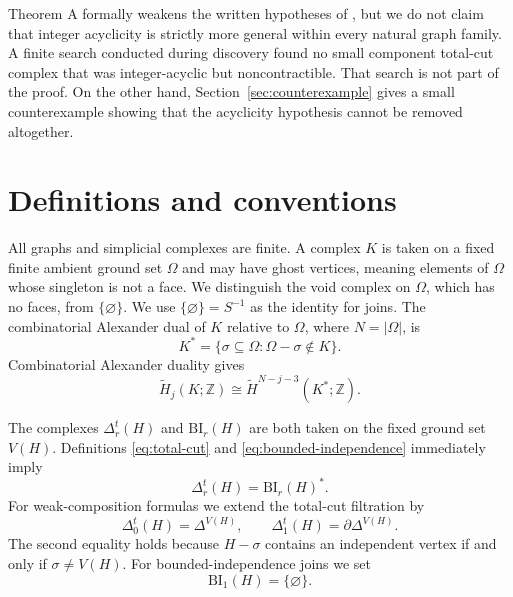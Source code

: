 \documentclass[11pt]{article}
\theoremstyle{remark}
\numberwithin{equation}{section}
\begin{document}
Theorem A formally weakens the written hypotheses of \cite[Theorem 28]{ref2},
but we do not claim that integer acyclicity is strictly more general within
every natural graph family. A finite search conducted during discovery found
no small component total-cut complex that was integer-acyclic but
noncontractible. That search is not part of the proof. On the other hand,
Section~\ref{sec:counterexample} gives a small counterexample showing that the
acyclicity hypothesis cannot be removed altogether.

\section{Definitions and conventions}\label{sec:definitions}

All graphs and simplicial complexes are finite. A complex $K$ is taken on a
fixed finite ambient ground set $\Omega$ and may have ghost vertices, meaning
elements of $\Omega$ whose singleton is not a face. We distinguish the void
complex on $\Omega$, which has no faces, from $\{\varnothing\}$. We use
$\{\varnothing\}=S^{-1}$ as the identity for joins. The combinatorial
Alexander dual of $K$ relative to $\Omega$, where $N=|\Omega|$, is
\begin{equation}
K^*=\{\sigma\subseteq\Omega:\Omega-\sigma\notin K\}.
\label{eq:alexander-dual}
\end{equation}
Combinatorial Alexander duality gives \cite{ref3}
\begin{equation}
\widetilde H_j(K;\mathbb Z)
\cong
\widetilde H^{N-j-3}(K^*;\mathbb Z).
\label{eq:combinatorial-ad}
\end{equation}

The complexes $\Delta_r^t(H)$ and $\mathrm{BI}_r(H)$ are both taken on the
fixed ground set $V(H)$. Definitions \eqref{eq:total-cut} and
\eqref{eq:bounded-independence} immediately imply
\begin{equation}
\Delta_r^t(H)=\mathrm{BI}_r(H)^*.
\label{eq:dual-filtrations}
\end{equation}
For weak-composition formulas we extend the total-cut filtration by
\begin{equation}
\Delta_0^t(H)=\Delta^{V(H)},
\qquad
\Delta_1^t(H)=\partial\Delta^{V(H)}.
\label{eq:total-cut-extension}
\end{equation}
The second equality holds because $H-\sigma$ contains an independent vertex
if and only if $\sigma\neq V(H)$. For bounded-independence joins we set
\begin{equation}
\mathrm{BI}_1(H)=\{\varnothing\}.
\label{eq:bi-one}
\end{equation}
\end{document}
